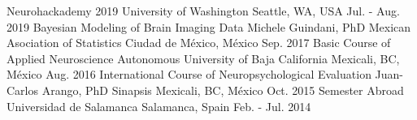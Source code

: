 \begin{cvcourses}
    \cvcourse
        {Neurohackademy 2019}
        {}
        {University of Washington}
        {Seattle, WA, USA}
        {Jul. - Aug. 2019}
    \cvcourse
        {Bayesian Modeling of Brain Imaging Data}
        {Michele Guindani, PhD}
        {Mexican Asociation of Statistics}
        {Ciudad de México, México}
        {Sep. 2017}
    \cvcourse
        {Basic Course of Applied Neuroscience}
        {}
        {Autonomous University of Baja California}
        {Mexicali, BC, México}
        {Aug. 2016}
    \cvcourse
        {International Course of Neuropsychological Evaluation}
        {Juan-Carlos Arango, PhD}
        {Sinapsis}
        {Mexicali, BC, México}
        {Oct. 2015}
    \cvcourse
        {Semester Abroad}
        {}
        {Universidad de Salamanca}
        {Salamanca, Spain}
        {Feb. - Jul. 2014}
\end{cvcourses}

